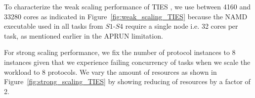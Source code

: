 








To characterize the weak scaling performance of TIES  , 
we use between 4160 and 33280 cores as indicated in Figure~\ref{fig:weak_scaling_TIES} because the NAMD executable used in all
tasks 
 from
$S1$-$S4$ require  a single node i.e. 32 cores per 
task, as mentioned earlier in the APRUN limitation. 

For strong scaling performance, we fix the number of protocol instances to 8
instances given that we experience failing 
concurrency of tasks when we scale the workload to 8 protocols. 
We vary the amount of resources as shown in
Figure~\ref{fig:strong_scaling_TIES} by showing reducing of resources by a 
factor of 2. 

